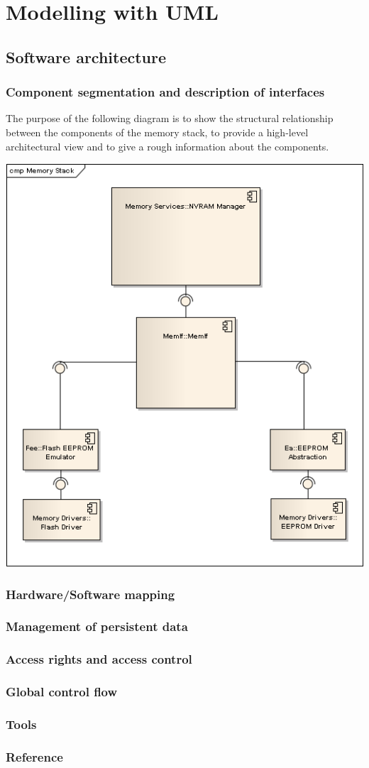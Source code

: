 \section{Modelling with UML}
\subsection{Software architecture}
\subsubsection{Component segmentation and description of interfaces}
The purpose of the following diagram is to show the structural relationship between the components of the memory stack, to provide a high-level architectural view and to give a rough information about the components.\\
\begin{center}
\includegraphics[scale=0.75]{Images/Memory_Stack_Overview_UML.png}
\end{center}
\subsubsection{Hardware/Software mapping}
\subsubsection{Management of persistent data}
\subsubsection{Access rights and access control}
\subsubsection{Global control flow}
\subsubsection{Tools}
\subsubsection{Reference}
